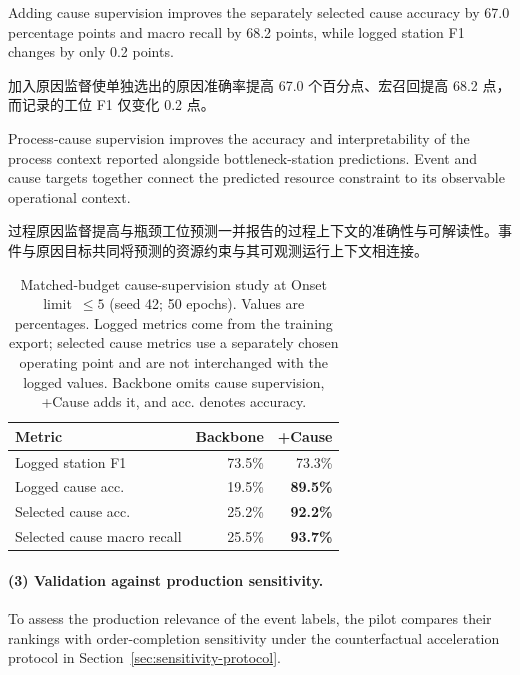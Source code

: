 \documentclass[a4paper,fleqn]{cas-dc}
\newcommand{\zhpara}[1]{%
  \par\begingroup\small\color{black!72}\noindent #1\par\endgroup}
\begin{document}
Adding cause supervision improves the separately selected cause accuracy by 67.0 percentage points and macro recall by 68.2 points, while logged station F1 changes by only 0.2 points.

\zhpara{加入原因监督使单独选出的原因准确率提高 67.0 个百分点、宏召回提高 68.2 点，而记录的工位 F1 仅变化 0.2 点。}


Process-cause supervision improves the accuracy and interpretability of the process context reported alongside bottleneck-station predictions. Event and cause targets together connect the predicted resource constraint to its observable operational context.

\zhpara{过程原因监督提高与瓶颈工位预测一并报告的过程上下文的准确性与可解读性。事件与原因目标共同将预测的资源约束与其可观测运行上下文相连接。}


\begin{table}[pos=!htbp]
\centering
\caption{Matched-budget cause-supervision study at Onset limit~$\leq5$ (seed 42; 50 epochs). Values are percentages. Logged metrics come from the training export; selected cause metrics use a separately chosen operating point and are not interchanged with the logged values. Backbone omits cause supervision, +Cause adds it, and acc. denotes accuracy.}
\label{tab:matched-cause}
\scriptsize
\setlength{\tabcolsep}{3.5pt}
\renewcommand{\arraystretch}{1.08}
\begin{tabular*}{\columnwidth}{@{\extracolsep{\fill}}lrr@{}}
\toprule
Metric & Backbone & +Cause \\
\midrule
Logged station F1 & 73.5\% & 73.3\% \\
Logged cause acc. & 19.5\% & \textbf{89.5\%} \\
Selected cause acc. & 25.2\% & \textbf{92.2\%} \\
Selected cause macro recall & 25.5\% & \textbf{93.7\%} \\
\bottomrule
\end{tabular*}
\end{table}

\paragraph*{(3) Validation against production sensitivity.}
To assess the production relevance of the event labels, the pilot compares their rankings with order-completion sensitivity under the counterfactual acceleration protocol in Section~\ref{sec:sensitivity-protocol}.
\end{document}
